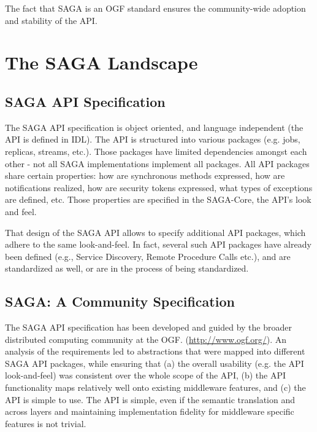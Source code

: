\documentclass[12pt]{article}
\begin{document}
The fact that SAGA is an OGF standard ensures the community-wide
adoption and stability of the
API.  %

\section{The SAGA Landscape}

 \subsection{SAGA API Specification}

  The SAGA API specification is object oriented, and language
  independent (the API is defined in IDL).  The API is structured into
  various packages (e.g. jobs, replicas, streams, etc.).  Those
  packages have limited dependencies amongst each other - not all SAGA
  implementations implement all packages.  All API packages share
  certain properties: how are synchronous methods expressed, how are
  notifications realized, how are security tokens expressed, what
  types of exceptions are defined, etc.  Those properties are
  specified in the SAGA-Core, the API's look and feel.

  That design of the SAGA API allows to specify additional API
  packages, which adhere to the same look-and-feel.  In fact, several
  such API packages have already been defined (e.g., Service
  Discovery, Remote Procedure Calls etc.), and are standardized as
  well, or are in the process of being standardized.

 \subsection{SAGA: A Community Specification}

  The SAGA API specification has been developed and guided by the
  broader distributed computing community at the OGF.
  (\url{http://www.ogf.org/}).  An analysis of the requirements led to
  abstractions that were mapped into different SAGA API packages,
  while ensuring that (a) the overall usability (e.g. the API
  look-and-feel) was consistent over the whole scope of the API, (b)
  the API functionality maps relatively well onto existing middleware
  features, and (c) the API is simple to use.  The API is simple, even
  if the semantic translation and across layers and maintaining
  implementation fidelity for middleware specific features is not
  trivial.
\end{document}
